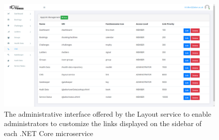 \begin{figure}[H]
    \centering
    \includegraphics[width=\textwidth]{Images/service_cms.png}
    \caption{The administrative interface offered by the Layout service to enable administrators to customize the links displayed on the sidebar of each .NET Core microservice}
\end{figure}